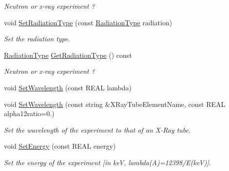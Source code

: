 \begin{DoxyCompactItemize}
\begin{DoxyCompactList}\small\item\em Neutron or x-\/ray experiment ? \end{DoxyCompactList}\item 
\mbox{\label{class_obj_cryst_1_1_powder_pattern_ad3def5314d887649c311a6519d3f6e28}} 
void \mbox{\hyperlink{class_obj_cryst_1_1_powder_pattern_ad3def5314d887649c311a6519d3f6e28}{Set\+Radiation\+Type}} (const \mbox{\hyperlink{namespace_obj_cryst_a48fe50a094c607f8897378934d3d73ef}{Radiation\+Type}} radiation)
\begin{DoxyCompactList}\small\item\em Set the radiation type. \end{DoxyCompactList}\item 
\mbox{\label{class_obj_cryst_1_1_powder_pattern_a7dab9ad22f88bd542b0b127aa7dc6cf8}} 
\mbox{\hyperlink{namespace_obj_cryst_a48fe50a094c607f8897378934d3d73ef}{Radiation\+Type}} \mbox{\hyperlink{class_obj_cryst_1_1_powder_pattern_a7dab9ad22f88bd542b0b127aa7dc6cf8}{Get\+Radiation\+Type}} () const
\begin{DoxyCompactList}\small\item\em Neutron or x-\/ray experiment ? \end{DoxyCompactList}\item 
void \mbox{\hyperlink{class_obj_cryst_1_1_powder_pattern_aea1c5351f710f2a91844b0f29b7b04aa}{Set\+Wavelength}} (const R\+E\+AL lambda)
\item 
void \mbox{\hyperlink{class_obj_cryst_1_1_powder_pattern_a9638b42f38dd82522593e1e01b6629c6}{Set\+Wavelength}} (const string \&X\+Ray\+Tube\+Element\+Name, const R\+E\+AL alpha12ratio=0.)
\begin{DoxyCompactList}\small\item\em Set the wavelength of the experiment to that of an X-\/\+Ray tube. \end{DoxyCompactList}\item 
\mbox{\label{class_obj_cryst_1_1_powder_pattern_a09820e4b8d5a7b7f0e68963cb62a20d9}} 
void \mbox{\hyperlink{class_obj_cryst_1_1_powder_pattern_a09820e4b8d5a7b7f0e68963cb62a20d9}{Set\+Energy}} (const R\+E\+AL energy)
\begin{DoxyCompactList}\small\item\em Set the energy of the experiment \mbox{[}in keV, lambda(\+A)=12398/E(keV)\mbox{]}. \end{DoxyCompactList}\item 

\end{DoxyCompactItemize}
